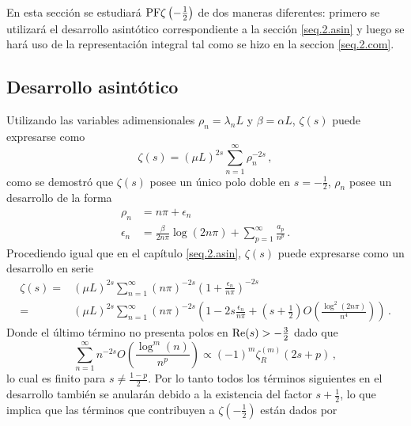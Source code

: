 En esta sección se estudiará ${\rm PF } \zeta \left( - \frac{1}{2} \right)$ de dos maneras diferentes: primero se utilizará el desarrollo asintótico correspondiente a la sección \ref{seq.2.asin} y luego se hará uso de la representación integral tal como se hizo en la seccion \ref{seq.2.com}.

\subsection{Desarrollo asintótico}\label{seq.desarrollo.asintotico}

Utilizando las variables adimensionales $\rho _n = \lambda _n L$ y $\beta = \alpha L$, $\zeta (s)$ puede expresarse como
\begin{equation*}
\zeta (s) = \left( \mu L \right) ^{2s} \sum _{n=1} ^{\infty} \rho _n ^{-2s} 
\, ,
\end{equation*}
como se demostró que $\zeta (s)$ posee un único polo doble en $s = -\frac{1}{2}$, $\rho _n$ posee un desarrollo de la forma
\begin{equation}
\begin{aligned}
\rho _n  &= 
			n \pi + \epsilon _n \\
			\epsilon _n &= 
			\frac{ \beta }{2 n \pi } \log (2 n \pi) +
			\sum _{p=1} ^{\infty} \frac{a _p}{n ^p }
			\, .
\end{aligned}
\end{equation}
Procediendo igual que en el capítulo \ref{seq.2.asin}, $\zeta (s)$ puede expresarse como un desarrollo en serie
\begin{align}
\zeta (s) =& 
( \mu L ) ^{2s}
\sum _{n=1} ^{\infty}
( n \pi) ^{-2s} \left( 1 + \frac{ \epsilon _n }{n \pi } \right) ^{-2s } \\
\nonumber
 =& 
(\mu L) ^{2s} \sum _{n=1} ^{\infty}
( n \pi) ^{-2s} \left(
						1 -2s  \frac{\epsilon _n}{n \pi} + 
						\left( s + \frac{1}{2} \right) 
						O \left( \frac{ \log ^2 ( 2 n \pi ) }{ n ^4} \right)  
						\right)
\, .
\end{align}
Donde el último término no presenta polos en \mbox{${\rm Re}(s) >- \frac{3}{2}$} dado que
\begin{equation} 
	\sum _{n=1} ^{\infty}
	 n  ^{-2s} O \left( \frac{ \log ^m (n)}{ n ^p} \right)
	\propto 
		(-1) ^m \zeta _R ^{(m)} (2s+p) 
\, ,
\end{equation}
lo cual es finito para $s \neq \frac{1-p}{2}$.
Por lo tanto todos los términos siguientes en el desarrollo también se anularán debido a la existencia del factor $s + \frac{1}{2}$, lo que implica que las términos que contribuyen a $\zeta \left( - \frac{1}{2} \right)$ están dados por
